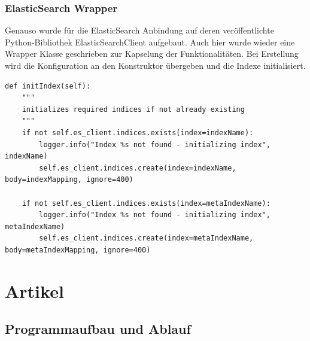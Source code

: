 \documentclass[12pt,oneside,a4paper,parskip]{scrbook}
\begin{document}
\subsubsection{ElasticSearch Wrapper}

Genauso wurde für die ElasticSearch Anbindung auf deren veröffentlichte Python-Bibliothek ElasticSearchClient aufgebaut. Auch hier wurde wieder eine Wrapper Klasse geschrieben zur Kapselung der Funktionalitäten. Bei Erstellung wird die Konfiguration an den Konstruktor übergeben und die Indexe initialisiert.

\begin{lstlisting}[basicstyle=\small, caption=Initialisierung der Indexe]
def initIndex(self):
    """
    initializes required indices if not already existing
    """
    if not self.es_client.indices.exists(index=indexName):
        logger.info("Index %s not found - initializing index", indexName)
        self.es_client.indices.create(index=indexName, body=indexMapping, ignore=400)

    if not self.es_client.indices.exists(index=metaIndexName):
        logger.info("Index %s not found - initializing index", metaIndexName)
        self.es_client.indices.create(index=metaIndexName, body=metaIndexMapping, ignore=400)
\end{lstlisting}
\pagebreak


\section{Artikel}


\subsection{Programmaufbau und Ablauf}
\end{document}
